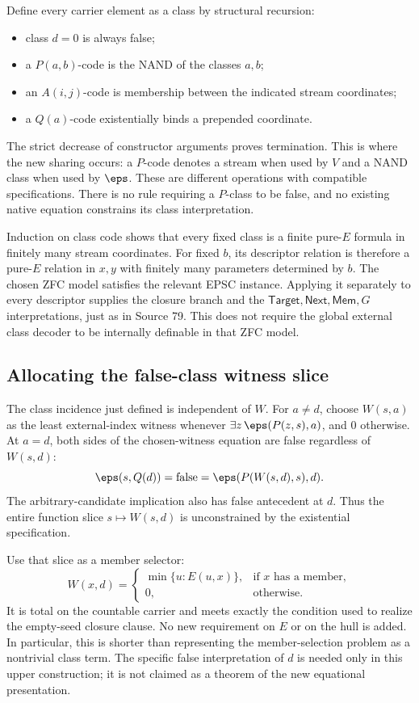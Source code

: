 Define every carrier element as a class by structural recursion:
\begin{itemize}
 \item class $d=0$ is always false;
 \item a $P(a,b)$-code is the NAND of the classes $a,b$;
 \item an $A(i,j)$-code is membership between the indicated stream coordinates;
 \item a $Q(a)$-code existentially binds a prepended coordinate.
\end{itemize}
The strict decrease of constructor arguments proves termination. This is
where the new sharing occurs: a $P$-code denotes a stream when used by $V$
and a NAND class when used by $\eps$. These are different operations with
compatible specifications. There is no rule requiring a $P$-class to be
false, and no existing native equation constrains its class interpretation.

Induction on class code shows that every fixed class is a finite pure-$E$
formula in finitely many stream coordinates. For fixed $b$, its descriptor
relation is therefore a pure-$E$ relation in $x,y$ with finitely many
parameters determined by $b$. The chosen ZFC model satisfies the relevant
EPSC instance. Applying it separately to every descriptor supplies the
closure branch and the $\mathsf{Target},\mathsf{Next},\mathsf{Mem},G$
interpretations, just as in Source 79. This does not require the global
external class decoder to be internally definable in that ZFC model.

\subsection{Allocating the false-class witness slice}

The class incidence just defined is independent of $W$. For $a\ne d$,
choose $W(s,a)$ as the least external-index witness whenever
$\exists z\,\eps(P(z,s),a)$, and 0 otherwise. At $a=d$, both sides of
the chosen-witness equation are false regardless of $W(s,d)$:
\[
 \eps(s,Q(d))=\text{false}
       =\eps(P(W(s,d),s),d).
\]
The arbitrary-candidate implication also has false antecedent at $d$.
Thus the entire function slice $s\mapsto W(s,d)$ is unconstrained by
the existential specification.

Use that slice as a member selector:
\[
 W(x,d)=
 \begin{cases}
  \min\{u:E(u,x)\},&\text{if $x$ has a member},\\
  0,&\text{otherwise}.
 \end{cases}
\]
It is total on the countable carrier and meets exactly the condition used
to realize the empty-seed closure clause. No new requirement on $E$ or
on the hull is added. In particular, this is shorter than representing
the member-selection problem as a nontrivial class term. The specific
false interpretation of $d$ is needed only in this upper construction;
it is not claimed as a theorem of the new equational presentation.

